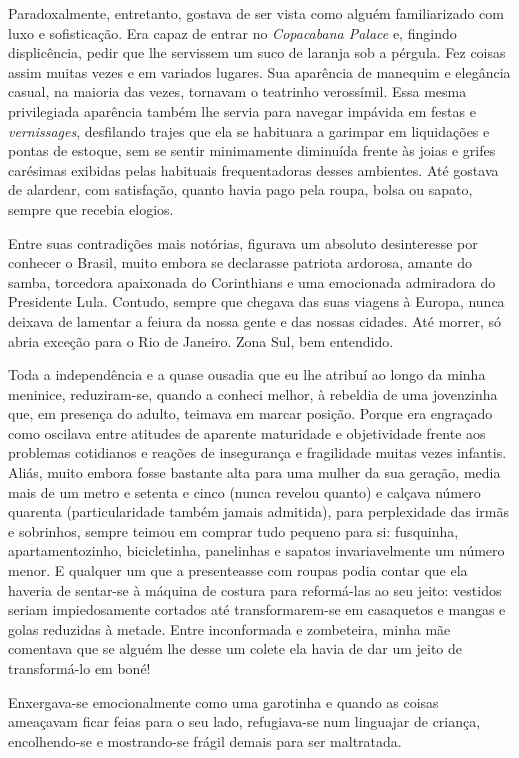 Paradoxalmente, entretanto, gostava de ser vista como alguém familiarizado com luxo e sofisticação.
Era capaz de entrar no \textit{Copacabana Palace} e, fingindo displicência, pedir que lhe servissem um suco de laranja sob a pérgula.
Fez coisas assim muitas vezes e em variados lugares.
Sua aparência de manequim e elegância casual, na maioria das vezes, tornavam o teatrinho verossímil.
Essa mesma privilegiada aparência também lhe servia para navegar impávida em festas e \textit{vernissages}, desfilando trajes que ela se habituara a garimpar em liquidações e pontas de estoque, sem se sentir minimamente diminuída frente às joias e grifes carésimas exibidas pelas habituais frequentadoras desses ambientes.
Até gostava de alardear, com satisfação, quanto havia pago pela roupa, bolsa ou sapato, sempre que recebia elogios.


Entre suas contradições mais notórias, figurava um absoluto desinteresse por conhecer o Brasil, muito embora se declarasse patriota ardorosa, amante do samba, torcedora apaixonada do Corinthians e uma emocionada admiradora do Presidente Lula.
Contudo, sempre que chegava das suas viagens à Europa, nunca deixava de lamentar a feiura da nossa gente e das nossas cidades.
Até morrer, só abria exceção para o Rio de Janeiro.
Zona Sul, bem entendido.

Toda a independência e a quase ousadia que eu lhe atribuí ao longo da minha meninice, reduziram-se, quando a conheci melhor, à rebeldia de uma jovenzinha que, em presença do adulto, teimava em marcar posição.
Porque era engraçado como oscilava entre atitudes de aparente maturidade e objetividade frente aos problemas cotidianos e reações de insegurança e fragilidade muitas vezes infantis.
Aliás, muito embora fosse bastante alta para uma mulher da sua geração, media mais de um metro e setenta e cinco (nunca revelou quanto) e calçava número quarenta (particularidade também jamais admitida), para perplexidade das irmãs e sobrinhos, sempre teimou em comprar tudo pequeno para si: fusquinha, apartamentozinho, bicicletinha, panelinhas e sapatos invariavelmente um número menor.
E qualquer um que a presenteasse com roupas podia contar que ela haveria de sentar-se à máquina de costura para reformá-las ao seu jeito: vestidos seriam impiedosamente cortados até transformarem-se em casaquetos e mangas e golas reduzidas à metade.
Entre inconformada e zombeteira, minha mãe comentava que se alguém lhe desse um colete ela havia de dar um jeito de transformá-lo em boné!

Enxergava-se emocionalmente como uma garotinha e quando as coisas ameaçavam ficar feias para o seu lado, refugiava-se num linguajar de criança, encolhendo-se e mostrando-se frágil demais para ser maltratada.

